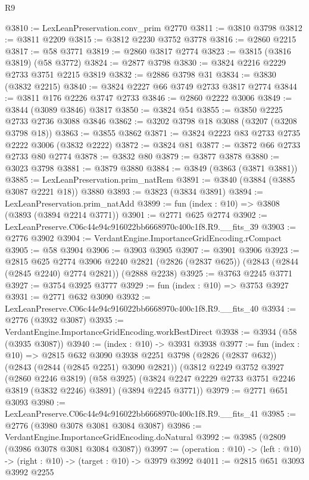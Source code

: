 \begin{lexlean}{R9}
\begin{coremodule}
@3810 := LexLeanPreservation.conv_prim @2770
@3811 := @3810 @3798
@3812 := @3811 @2209
@3815 := @3812 @2230 @3752 @3778
@3816 := @2860 @2215
@3817 := @58 @3771
@3819 := @2860 @3817 @2774
@3823 := @3815 (@3816 @3819) (@58 @3772)
@3824 := @2877 @3798
@3830 := @3824 @2216 @2229 @2733 @3751 @2215 @3819
@3832 := @2886 @3798 @31
@3834 := @3830 (@3832 @2215)
@3840 := @3824 @2227 @66 @3749 @2733 @3817 @2774
@3844 := @3811 @176 @2226 @3747 @2733
@3846 := @2860 @2222 @3006
@3849 := @3844 (@3089 @3846) @3817
@3850 := @3824 @54
@3855 := @3850 @2225 @2733 @2736 @3088 @3846
@3862 := @3202 @3798 @18 @3088 (@3207 (@3208 @3798 @18))
@3863 := @3855 @3862
@3871 := @3824 @2223 @83 @2733 @2735 @2222 @3006 (@3832 @2222)
@3872 := @3824 @81
@3877 := @3872 @66 @2733 @2733 @80 @2774
@3878 := @3832 @80
@3879 := @3877 @3878
@3880 := @3023 @3798
@3881 := @3879 @3880
@3884 := @3849 (@3863 (@3871 @3881))
@3885 := LexLeanPreservation.prim_natRem
@3891 := @3840 (@3884 (@3885 @3087 @2221 @18)) @3880
@3893 := @3823 (@3834 @3891)
@3894 := LexLeanPreservation.prim_natAdd
@3899 := fun (index : @10) => @3808 (@3893 (@3894 @2214 @3771))
@3901 := @2771 @625 @2774
@3902 := LexLeanPreserve.C06c44e94c916022bb6668970c400c1f8.R9.__fits_39
@3903 := @2776 @3902
@3904 := VerdantEngine.ImportanceGridEncoding.rCompact
@3905 := @58 @3904
@3906 := @3903 @3905
@3907 := @3901 @3906
@3923 := @2815
    @625
    @2774
    @3906
    @2240
    @2821
    (@2826 (@2837 @625))
    (@2843 (@2844 (@2845 @2240) @2774 @2821))
    (@2888 @2238)
@3925 := @3763 @2245 @3771
@3927 := @3754 @3925 @3777
@3929 := fun (index : @10) => @3753 @3927
@3931 := @2771 @632 @3090
@3932 := LexLeanPreserve.C06c44e94c916022bb6668970c400c1f8.R9.__fits_40
@3934 := @2776 (@3932 @3087)
@3935 := VerdantEngine.ImportanceGridEncoding.workBestDirect
@3938 := @3934 (@58 (@3935 @3087))
@3940 := (index : @10) -> @3931 @3938
@3977 := fun (index : @10) =>
  @2815
    @632
    @3090
    @3938
    @2251
    @3798
    (@2826 (@2837 @632))
    (@2843 (@2844 (@2845 @2251) @3090 @2821))
    (@3812
      @2249
      @3752
      @3927
      (@2860 @2246 @3819)
      (@58 @3925)
      (@3824 @2247 @2229 @2733 @3751 @2246 @3819 (@3832 @2246) @3891)
      (@3894 @2245 @3771))
@3979 := @2771 @651 @3093
@3980 := LexLeanPreserve.C06c44e94c916022bb6668970c400c1f8.R9.__fits_41
@3985 := @2776 (@3980 @3078 @3081 @3084 @3087)
@3986 := VerdantEngine.ImportanceGridEncoding.doNatural
@3992 := @3985 (@2809 (@3986 @3078 @3081 @3084 @3087))
@3997 := (operation : @10) -> (left : @10) -> (right : @10) -> (target : @10) -> @3979 @3992
@4011 := @2815
    @651
    @3093
    @3992
    @2255

\end{coremodule}
\end{lexlean}
